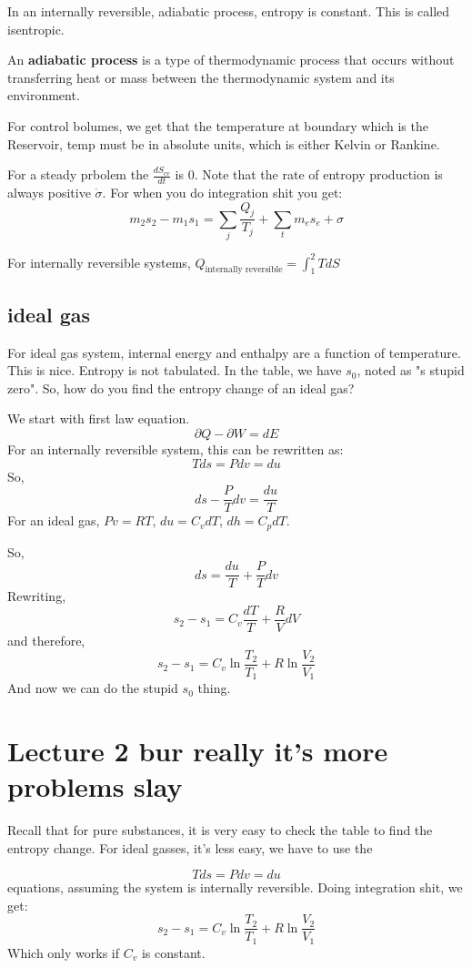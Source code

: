 \documentclass{article}
\begin{document}
In an internally reversible, adiabatic process, entropy is constant. This is called isentropic.

\begin{definition}[adiabatic]
     An \textbf{adiabatic process} is a type of thermodynamic process that occurs without transferring heat or mass between the thermodynamic system and its environment.
\end{definition}


For control bolumes, we get that the temperature at boundary which is the Reservoir, temp must be in absolute units, which is either Kelvin or Rankine.

For a steady prbolem the $\frac{dS_{cv}}{dt}$ is $0$. Note that the rate of entropy production is always positive $\dot \sigma$. For when you do integration shit you get:
\[m_2s_2 - m_1s_1 = \sum_j \frac{Q_j}{T_j} + \sum_t m_es_e + \sigma\]

For internally reversible systems, $Q_{\text{internally reversible}} = \int_1^2 T dS$
\subsection{ideal gas}
For ideal gas system, internal energy and enthalpy are a function of temperature. This is nice. Entropy is not tabulated. In the table, we have $s_0$, noted as "s stupid zero". So, how do you find the entropy change of an ideal gas? 

We start with first law equation.
\[\partial Q - \partial W = dE\]
For an internally reversible system, this can be rewritten as:
\[Tds = Pdv  = du\]
So, 
\[ds - \frac{P}{T}dv = \frac{du}{T}\]
For an ideal gas, 
$Pv = RT$, $du = C_vdT$, $dh = C_pdT$.

So,
\[ds = \frac{du}{T} + \frac{P}{T}dv\]
Rewriting,
\[s_2 - s_1 = C_v \frac{dT}{T} + \frac{R}{V}dV\]
and therefore,
\[s_2 - s_1 = C_v \ln{\frac{T_2}{T_1}} + R \ln{\frac{V_2}{V_1}}\]
And now we can do the stupid $s_0$ thing. 



\section{Lecture 2 bur really it's more problems slay}
Recall that for pure substances, it is very easy to check the table to find the entropy change. For ideal gasses, it's less easy, we have to use the 

\[Tds = Pdv  = du\]
equations, assuming the system is internally reversible. Doing integration shit, we get:
\[s_2 - s_1 = C_v \ln{\frac{T_2}{T_1}} + R \ln{\frac{V_2}{V_1}}\]
Which only works if $C_v$ is constant.
\end{document}
